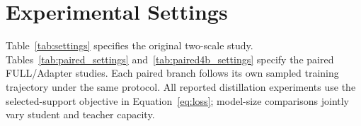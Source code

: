 \section{Experimental Settings}
\label{app:settings}
Table~\ref{tab:settings} specifies the original two-scale study. Tables~\ref{tab:paired_settings} and~\ref{tab:paired4b_settings} specify the paired FULL/Adapter studies. Each paired branch follows its own sampled training trajectory under the same protocol. All reported distillation experiments use the selected-support objective in Equation~\ref{eq:loss}; model-size comparisons jointly vary student and teacher capacity.




